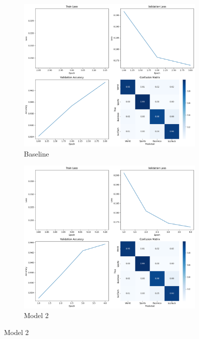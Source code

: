 \documentclass[letterpaper]{article}
\begin{document}
\begin{figure}[h]
    \centering
    \begin{subfigure}[b]{0.15\textwidth}
        \centering
        \includegraphics[width=\linewidth]{images/baseline.png}
        \caption{Baseline}
        \label{fig:baseline}
    \end{subfigure}
    \begin{subfigure}[b]{0.15\textwidth}
        \centering
        \includegraphics[width=\linewidth]{images/model_2.png}
        \caption{Model 2}
        \label{fig:model2}

\end{subfigure}
\end{figure}
\end{document}
